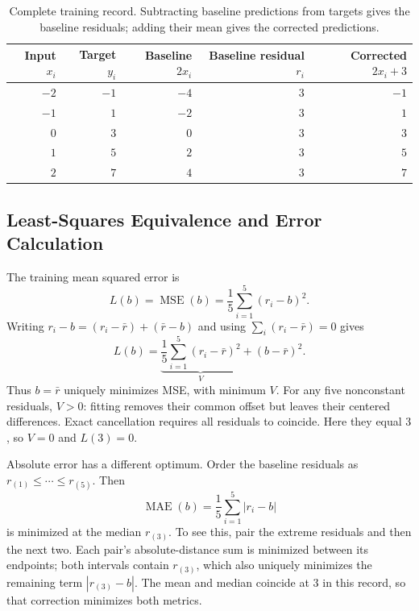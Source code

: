 \documentclass[11pt]{article}
\begin{document}
\begin{table}[htbp]
    \centering
    \caption{Complete training record. Subtracting baseline predictions from targets gives the baseline residuals; adding their mean gives the corrected predictions.}
    \label{tab:observations}
    \begin{tabular}{rrrrr}
        \toprule
        \shortstack[r]{Input\\$x_i$} &
        \shortstack[r]{Target\\$y_i$} &
        \shortstack[r]{Baseline\\$2x_i$} &
        \shortstack[r]{Baseline residual\\$r_i$} &
        \shortstack[r]{Corrected\\$2x_i+3$} \\
        \midrule
        $-2$ & $-1$ & $-4$ & $3$ & $-1$ \\
        $-1$ & $1$  & $-2$ & $3$ & $1$  \\
        $0$  & $3$  & $0$  & $3$ & $3$  \\
        $1$  & $5$  & $2$  & $3$ & $5$  \\
        $2$  & $7$  & $4$  & $3$ & $7$  \\
        \bottomrule
    \end{tabular}
\end{table}

\subsection{Least-Squares Equivalence and Error Calculation}
\label{sec:least_squares}

The training mean squared error is
\[
L(b)=\operatorname{MSE}(b)
=\frac{1}{5}\sum_{i=1}^{5}(r_i-b)^2.
\]
Writing $r_i-b=(r_i-\bar r)+(\bar r-b)$ and using
$\sum_i(r_i-\bar r)=0$ gives
\[
L(b)=
\underbrace{\frac{1}{5}\sum_{i=1}^{5}(r_i-\bar r)^2}_{V}
+(b-\bar r)^2.
\]
Thus $b=\bar r$ uniquely minimizes MSE, with minimum $V$. For any five nonconstant residuals, $V>0$: fitting removes their common offset but leaves their centered differences. Exact cancellation requires all residuals to coincide. Here they equal $3$, so $V=0$ and $L(3)=0$.

Absolute error has a different optimum. Order the baseline residuals as
$r_{(1)}\leq\cdots\leq r_{(5)}$. Then
\[
\operatorname{MAE}(b)=\frac{1}{5}\sum_{i=1}^{5}|r_i-b|
\]
is minimized at the median $r_{(3)}$. To see this, pair the extreme residuals and then the next two. Each pair's absolute-distance sum is minimized between its endpoints; both intervals contain $r_{(3)}$, which also uniquely minimizes the remaining term $|r_{(3)}-b|$. The mean and median coincide at $3$ in this record, so that correction minimizes both metrics.
\end{document}
